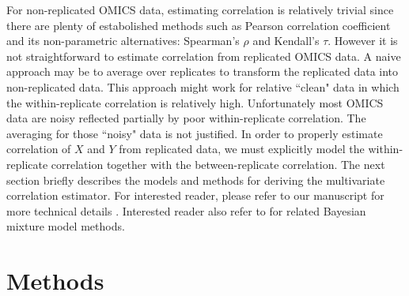 \documentclass[a4paper]{article}
\begin{document}
For non-replicated OMICS data, estimating correlation is relatively trivial since
there are plenty of estabolished methods such as Pearson correlation coefficient
and its non-parametric alternatives: Spearman's $\rho$ and Kendall's $\tau$. However
it is not straightforward to estimate correlation from replicated OMICS data.
A naive approach may be to average over replicates to transform the replicated data
into non-replicated data. This approach might work for relative ``clean" data in 
which the within-replicate correlation is relatively high. Unfortunately most OMICS data 
are noisy reflected partially by poor within-replicate correlation. The averaging 
for those ``noisy" data is not justified. In order to properly estimate correlation of
$X$ and $Y$ from replicated data, we must explicitly model the within-replicate 
correlation together with the between-replicate correlation. The next section
briefly describes the models and methods for deriving the multivariate correlation
estimator. For interested reader, please refer to our manuscript for more technical 
details \cite{Zhu07}. Interested reader also refer to \cite{Medvedovic04} for 
related Bayesian mixture model methods.
 
\section{Methods}
\end{document}
